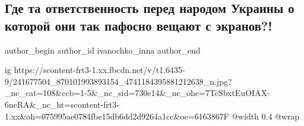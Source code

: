  
 
 
 
 
 
\subsection{Где та ответственность  перед народом Украины  о которой они так пафосно вещают с экранов?!}
\label{sec:10_09_2021.fb.ivanochko_inna.1.narod_vlast_otvetstvennost}
 
\ifcmt
 author_begin
   author_id ivanochko_inna
 author_end
\fi

\ifcmt
  ig https://scontent-frt3-1.xx.fbcdn.net/v/t1.6435-9/241677504_870101993893154_4741184395881212638_n.jpg?_nc_cat=108&ccb=1-5&_nc_sid=730e14&_nc_ohc=7TcSbxtEuOIAX-6neRA&_nc_ht=scontent-frt3-1.xx&oh=075995ae0784fbe15db6dd2d9264a1cc&oe=6163867F
  @width 0.4
  @wrap 
\fi

